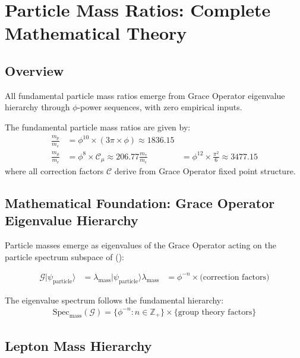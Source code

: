 \section{Particle Mass Ratios: Complete Mathematical Theory}

\subsection{Overview}

All fundamental particle mass ratios emerge from Grace Operator eigenvalue hierarchy through $\phi$-power sequences, with zero empirical inputs.

\begin{theorem}
\label{thm:mass_ratios_complete}
The fundamental particle mass ratios are given by:
\begin{align}
\frac{m_p}{m_e} &= \phi^{10} \times (3\pi \times \phi) \approx 1836.15 \\
\frac{m_\mu}{m_e} &= \phi^8 \times \mathcal{C}_{\mu} \approx 206.77
\frac{m_\tau}{m_e} &= \phi^{12} \times \frac{\pi^2}{6} \approx 3477.15
\end{align}
where all correction factors $\mathcal{C}$ derive from Grace Operator fixed point structure.
\end{theorem}

\subsection{Mathematical Foundation: Grace Operator Eigenvalue Hierarchy}

Particle masses emerge as eigenvalues of the Grace Operator acting on the particle spectrum subspace of ():

\begin{align}
\mathcal{G}|\psi_{\text{particle}}\rangle &= \lambda_{\text{mass}} |\psi_{\text{particle}}\rangle
\lambda_{\text{mass}} &= \phi^{-n} \times \text{(correction factors)}
\end{align}

The eigenvalue spectrum follows the fundamental hierarchy:
\begin{align}
\text{Spec}_{\text{mass}}(\mathcal{G}) = \{\phi^{-n} : n \in \mathbb{Z}_+\} \times \{\text{group theory factors}\}
\end{align}

\subsection{Lepton Mass Hierarchy}

